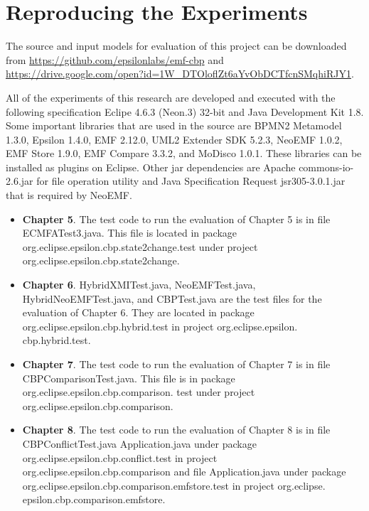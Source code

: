 \chapter{Reproducing the Experiments}
\label{sec:reproducing_experiments}

The source and input models for evaluation of this project can be downloaded from \url{https://github.com/epsilonlabs/emf-cbp} and \url{https://drive.google.com/open?id=1W_DTOloflZt6aYvObDCTfcnSMqhiRJY1}.

All of the experiments of this research are developed and executed with the following specification Eclipe 4.6.3 (Neon.3) 32-bit and Java Development Kit 1.8. Some important libraries that are used in the source are BPMN2 Metamodel	1.3.0, Epsilon 1.4.0, EMF 2.12.0, UML2 Extender SDK	5.2.3, NeoEMF 1.0.2, 
EMF Store 1.9.0, EMF Compare 3.3.2, and MoDisco 1.0.1. These libraries can be installed as plugins on Eclipse. Other jar dependencies are Apache commons-io-2.6.jar for file operation utility and Java Specification Request jsr305-3.0.1.jar that is required by NeoEMF.

\begin{itemize}
  \item \textbf{Chapter 5}. The test code to run the evaluation of Chapter 5 is in file ECMFATest3.java. This file is located in package org.eclipse.epsilon.cbp.state2change.test under project
  org.eclipse.epsilon.cbp.state2change.
  \item \textbf{Chapter 6}. HybridXMITest.java, NeoEMFTest.java, HybridNeoEMFTest.java, and CBPTest.java are the test files for the evaluation of Chapter 6. They are located in package org.eclipse.epsilon.cbp.hybrid.test in project org.eclipse.epsilon. cbp.hybrid.test.
  \item \textbf{Chapter 7}. The test code to run the evaluation of Chapter 7 is in file CBPComparisonTest.java. This file is in package org.eclipse.epsilon.cbp.comparison. test under project
  org.eclipse.epsilon.cbp.comparison.
  \item \textbf{Chapter 8}. The test code to run the evaluation of Chapter 8 is in file CBPConflictTest.java Application.java under package org.eclipse.epsilon.cbp.conflict.test in project org.eclipse.epsilon.cbp.comparison and file
  Application.java under package org.eclipse.epsilon.cbp.comparison.emfstore.test in project org.eclipse. epsilon.cbp.comparison.emfstore. 
\end{itemize}